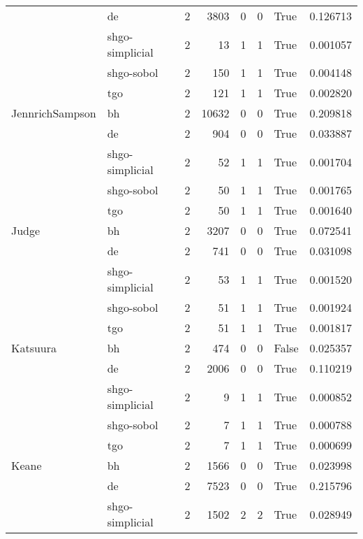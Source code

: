 \begin{longtable}{llrrrrlr}
         & de &     2 &     3803 &      0 &       0 &    True &    0.126713 \\
         & shgo-simplicial &     2 &       13 &      1 &       1 &    True &    0.001057 \\
         & shgo-sobol &     2 &      150 &      1 &       1 &    True &    0.004148 \\
         & tgo &     2 &      121 &      1 &       1 &    True &    0.002820 \\
JennrichSampson & bh &     2 &    10632 &      0 &       0 &    True &    0.209818 \\
         & de &     2 &      904 &      0 &       0 &    True &    0.033887 \\
         & shgo-simplicial &     2 &       52 &      1 &       1 &    True &    0.001704 \\
         & shgo-sobol &     2 &       50 &      1 &       1 &    True &    0.001765 \\
         & tgo &     2 &       50 &      1 &       1 &    True &    0.001640 \\
Judge & bh &     2 &     3207 &      0 &       0 &    True &    0.072541 \\
         & de &     2 &      741 &      0 &       0 &    True &    0.031098 \\
         & shgo-simplicial &     2 &       53 &      1 &       1 &    True &    0.001520 \\
         & shgo-sobol &     2 &       51 &      1 &       1 &    True &    0.001924 \\
         & tgo &     2 &       51 &      1 &       1 &    True &    0.001817 \\
Katsuura & bh &     2 &      474 &      0 &       0 &   False &    0.025357 \\
         & de &     2 &     2006 &      0 &       0 &    True &    0.110219 \\
         & shgo-simplicial &     2 &        9 &      1 &       1 &    True &    0.000852 \\
         & shgo-sobol &     2 &        7 &      1 &       1 &    True &    0.000788 \\
         & tgo &     2 &        7 &      1 &       1 &    True &    0.000699 \\
Keane & bh &     2 &     1566 &      0 &       0 &    True &    0.023998 \\
         & de &     2 &     7523 &      0 &       0 &    True &    0.215796 \\
         & shgo-simplicial &     2 &     1502 &      2 &       2 &    True &    0.028949 \\

\end{longtable}
